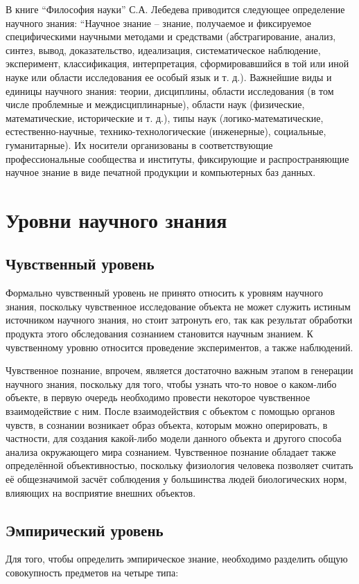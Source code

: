 \documentclass[14pt]{article}
\begin{document}
В книге ``Философия науки'' С.А. Лебедева приводится следующее определение научного знания: ``Научное знание -- знание, получаемое и фиксируемое специфическими научными методами и средствами (абстра­гирование, анализ, синтез, вывод, доказательство, идеализация, систематическое наблюдение, эксперимент, классификация, интерпретация, сформировавшийся в той или иной науке или области исследования ее особый язык и т. д.). Важнейшие виды и единицы научного знания: теории, дисциплины, области исследования (в том числе проблемные и междисциплинарные), области наук (физические, математические, исторические и т. д.), типы наук (логико-математические, естественно-научные, технико-технологические (инженерные), социальные, гуманитарные). Их носители организованы в соответствующие профессиональные сообщества и институты, фиксирующие и распространяющие научное знание в виде печатной продукции и компьютерных баз данных.

 \section{Уровни научного знания}
 
 \subsection{Чувственный уровень}
 
Формально чувственный уровень не принято относить к уровням научного знания, поскольку чувственное исследование объекта не может служить истиным источником научного знания, но стоит затронуть его, так как результат обработки продукта этого обследования сознанием становится научным знанием. К чувственному уровню относится проведение экспериментов, а также наблюдений. 

Чувственное познание, впрочем, является достаточно важным этапом в генерации научного знания, поскольку для того, чтобы узнать что-то новое о каком-либо объекте, в первую очередь необходимо провести некоторое чувственное взаимодействие с ним. После взаимодействия с объектом с помощью органов чувств, в сознании возникает образ объекта, которым можно оперировать, в частности, для создания какой-либо модели данного объекта и другого способа анализа окружающего мира сознанием. Чувственное познание обладает также определённой объективностью, поскольку физиология человека позволяет считать её общезначимой засчёт соблюдения у большинства людей биологических норм, влияющих на восприятие внешних объектов.
\subsection{Эмпирический уровень}
Для того, чтобы определить эмпирическое знание, необходимо разделить общую совокупность предметов на четыре типа:  
  
\end{document}

